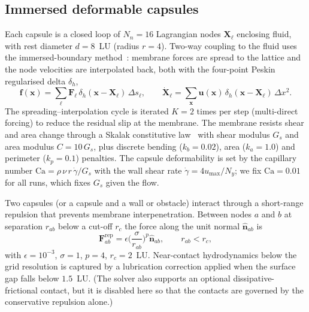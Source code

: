 \documentclass[11pt,a4paper]{article}
\begin{document}
\subsection{Immersed deformable capsules}
\label{sec:capsules}

Each capsule is a closed loop of $N_n=16$ Lagrangian nodes
$\boldsymbol X_\ell$ enclosing fluid, with rest diameter $d=8$~LU
(radius $r=4$). Two-way coupling to the fluid uses the immersed-boundary
method~\citep{peskin2002immersed}: membrane forces are spread to the
lattice and the node velocities are interpolated back, both with the
four-point Peskin regularised delta $\delta_h$,
\begin{equation}
\boldsymbol f(\boldsymbol x)=\sum_\ell
\boldsymbol F_\ell\,\delta_h(\boldsymbol x-\boldsymbol X_\ell)\,\Delta s_\ell,
\qquad
\dot{\boldsymbol X}_\ell=\sum_{\boldsymbol x}
\boldsymbol u(\boldsymbol x)\,\delta_h(\boldsymbol x-\boldsymbol X_\ell)\,\Delta x^2 .
\label{eq:ibm}
\end{equation}
The spreading--interpolation cycle is iterated $K=2$ times per step
(multi-direct forcing) to reduce the residual slip at the membrane. The
membrane resists shear and area change through a Skalak constitutive
law~\citep{skalak1973strain} with shear modulus $G_s$ and area modulus
$C=10\,G_s$, plus discrete bending ($k_b=0.02$), area ($k_a=1.0$) and
perimeter ($k_p=0.1$) penalties. The capsule deformability is set by the
capillary number $\mathrm{Ca}=\rho\,\nu\,r\,\dot\gamma/G_s$ with the wall
shear rate $\dot\gamma=4u_{\max}/N_y$; we fix $\mathrm{Ca}=0.01$ for all
runs, which fixes $G_s$ given the flow.

Two capsules (or a capsule and a wall or obstacle) interact through a
short-range repulsion that prevents membrane interpenetration. Between
nodes $a$ and $b$ at separation $r_{ab}$ below a cut-off $r_c$ the force
along the unit normal $\hat{\boldsymbol n}_{ab}$ is
\begin{equation}
\boldsymbol F^{\mathrm{rep}}_{ab}
=\epsilon\Big(\frac{\sigma}{r_{ab}}\Big)^{p}\hat{\boldsymbol n}_{ab},
\qquad r_{ab}<r_c,
\label{eq:repulsion}
\end{equation}
with $\epsilon=10^{-3}$, $\sigma=1$, $p=4$, $r_c=2$~LU. Near-contact
hydrodynamics below the grid resolution is captured by a lubrication
correction applied when the surface gap falls below $1.5$~LU. (The
solver also supports an optional dissipative-frictional contact, but it
is disabled here so that the contacts are governed by the conservative
repulsion alone.)
\end{document}
